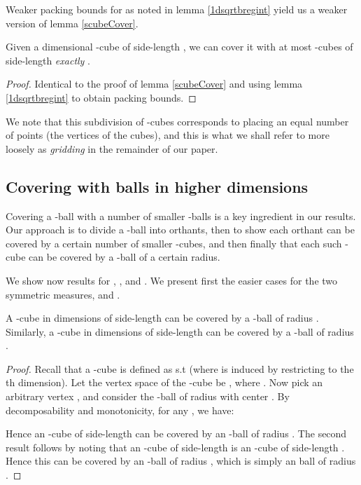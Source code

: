 \documentclass[11pt]{myclass}
\begin{document}
 Weaker packing bounds for  as noted in lemma \ref{1dsqrtbregint} yield us a weaker version of lemma \ref{scubeCover}.
\begin{lemma}\label{acubeCover}
Given a  dimensional -cube  of side-length , 
we can cover it with at most  -cubes of side-length \emph{exactly} .
\end{lemma}
\begin{proof}
Identical to the proof of lemma \ref{scubeCover} and using lemma \ref{1dsqrtbregint} to obtain packing bounds.
\end{proof}
We note that this subdivision of -cubes corresponds to placing an equal number of points (the vertices of the cubes),
and this is what we shall refer to more loosely as \emph{gridding} in the remainder of our paper.



\subsection{Covering with balls in higher dimensions}
Covering a -ball with a number of smaller -balls is a key ingredient in our results. Our approach is to divide a -ball into 
orthants, then to show each orthant can be covered by a certain number of smaller -cubes, and then finally that each
such -cube
can be covered by a -ball of a certain radius. 

We show now results for ,
,  and . We present first the easier cases for the two symmetric measures,  and
. 

\begin{lemma}\label{scube}
A -cube in  dimensions of side-length  can be covered by a -ball of radius . 
Similarly, a -cube in  dimensions of side-length  can be covered by a -ball
of radius . 
\end{lemma}

\begin{proof}
Recall that a -cube is defined as  s.t  (where  is
induced by restricting  to the th dimension). Let the vertex space of the -cube be , where . Now pick an arbitrary vertex , and consider
the -ball  of radius  with center . By decomposability and monotonicity, for any , we have:
 
Hence an -cube of side-length  can be covered by an -ball of radius .  The second result follows
by noting that an -cube of side-length  is an -cube of side-length . Hence this can be covered
by an -ball of radius , which is simply an  ball of radius .
\end{proof}
\end{document}
